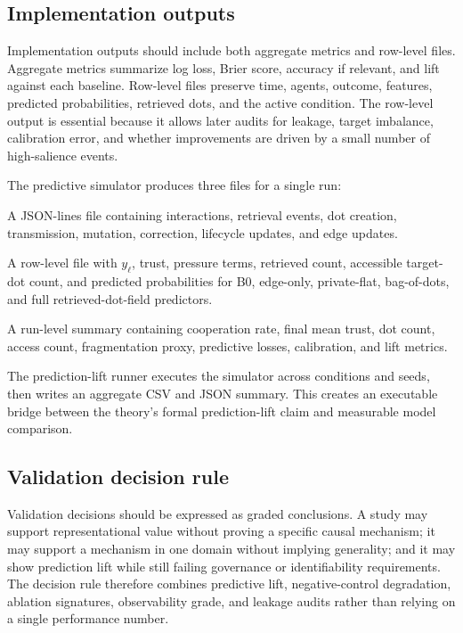 \documentclass[11pt]{article}
\theoremstyle{remark}
\begin{document}
\subsection{Implementation outputs}\label{prediction-implementation-outputs}

Implementation outputs should include both aggregate metrics and row-level files. Aggregate metrics summarize log loss, Brier score, accuracy if relevant, and lift against each baseline. Row-level files preserve time, agents, outcome, features, predicted probabilities, retrieved dots, and the active condition. The row-level output is essential because it allows later audits for leakage, target imbalance, calibration error, and whether improvements are driven by a small number of high-salience events.


The predictive simulator produces three files for a single run:

\begin{description}[leftmargin=3.0cm,style=nextline]
\item[Event log]
A JSON-lines file containing interactions, retrieval events, dot creation,
transmission, mutation, correction, lifecycle updates, and edge updates.

\item[Prediction CSV]
A row-level file with $y_\ell$, trust, pressure terms, retrieved count,
accessible target-dot count, and predicted probabilities for B0, edge-only,
private-flat, bag-of-dots, and full retrieved-dot-field predictors.

\item[Summary JSON]
A run-level summary containing cooperation rate, final mean trust, dot count,
access count, fragmentation proxy, predictive losses, calibration, and lift
metrics.
\end{description}

The prediction-lift runner executes the simulator across conditions and seeds,
then writes an aggregate CSV and JSON summary. This creates an executable
bridge between the theory's formal prediction-lift claim and measurable model
comparison.

\subsection{Validation decision rule}\label{prediction-validation-decision-rule}

Validation decisions should be expressed as graded conclusions. A study may support representational value without proving a specific causal mechanism; it may support a mechanism in one domain without implying generality; and it may show prediction lift while still failing governance or identifiability requirements. The decision rule therefore combines predictive lift, negative-control degradation, ablation signatures, observability grade, and leakage audits rather than relying on a single performance number.
\end{document}

